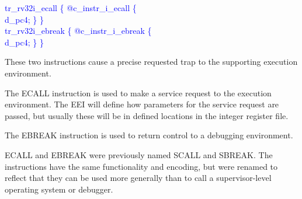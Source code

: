 \textcolor{blue}{
   tr\_rv32i\_ecall \{ @c\_instr\_i\_ecall \{ \\%
\indent \hspace{\parindent} d\_pc4; \} \} \\%
\indent tr\_rv32i\_ebreak \{ @c\_instr\_i\_ebreak \{ \\%
\indent \hspace{\parindent} d\_pc4; \} \} \\%
}

These two instructions cause a precise requested trap to the
supporting execution environment.

The ECALL instruction is used to make a service request to the
execution environment.  The EEI will define how parameters for the
service request are passed, but usually these will be in defined
locations in the integer register file.

The EBREAK instruction is used to return control to a debugging
environment.

\begin{commentary}
ECALL and EBREAK were previously named SCALL and SBREAK.  The
instructions have the same functionality and encoding, but were
renamed to reflect that they can be used more generally than to call a
supervisor-level operating system or debugger.
\end{commentary}

